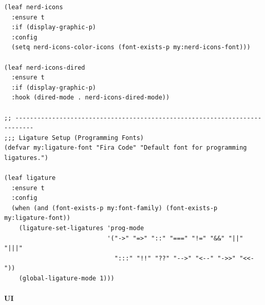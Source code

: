 \documentclass[11pt]{article}
\begin{document}
\begin{verbatim}
(leaf nerd-icons
  :ensure t
  :if (display-graphic-p)
  :config
  (setq nerd-icons-color-icons (font-exists-p my:nerd-icons-font)))

(leaf nerd-icons-dired
  :ensure t
  :if (display-graphic-p)
  :hook (dired-mode . nerd-icons-dired-mode))

;; ---------------------------------------------------------------------------
;;; Ligature Setup (Programming Fonts)
(defvar my:ligature-font "Fira Code" "Default font for programming ligatures.")

(leaf ligature
  :ensure t
  :config
  (when (and (font-exists-p my:font-family) (font-exists-p my:ligature-font))
    (ligature-set-ligatures 'prog-mode
                            '("->" "=>" "::" "===" "!=" "&&" "||" "|||"
                              ":::" "!!" "??" "-->" "<--" "->>" "<<-"))
    (global-ligature-mode 1)))
\end{verbatim}
\paragraph{UI}
\label{sec:org6f72337}
\end{document}
